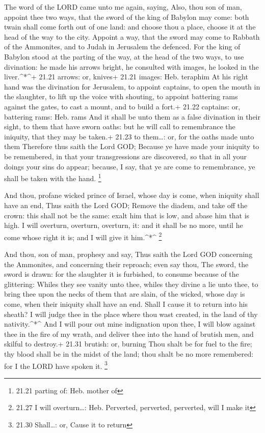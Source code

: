  The word of the LORD came unto me again, saying,
 Also, thou son of man, appoint thee two ways, that the
sword of the king of Babylon may come: both twain shall come forth out
of one land: and choose thou a place, choose it at the head of the way
to the city.  Appoint a way, that the sword may come to
Rabbath of the Ammonites, and to Judah in Jerusalem the defenced.
 For the king of Babylon stood at the parting of the way,
at the head of the two ways, to use divination: he made his arrows
bright, he consulted with images, he looked in the liver.\^{}*\^{}+
21.21 arrows: or, knives+ 21.21 images: Heb. teraphim  At
his right hand was the divination for Jerusalem, to appoint captains, to
open the mouth in the slaughter, to lift up the voice with shouting, to
appoint battering rams against the gates, to cast a mount, and to build
a fort.+ 21.22 captains: or, battering rams: Heb. rams  And
it shall be unto them as a false divination in their sight, to them that
have sworn oaths: but he will call to remembrance the iniquity, that
they may be taken.+ 21.23 to them\ldots: or, for the oaths made unto
them  Therefore thus saith the Lord GOD; Because ye have
made your iniquity to be remembered, in that your transgressions are
discovered, so that in all your doings your sins do appear; because, I
say, that ye are come to remembrance, ye shall be taken with the hand.
\footnote{21.21 parting of: Heb. mother of}

 And thou, profane wicked prince of Israel, whose day is
come, when iniquity shall have an end,  Thus saith the Lord
GOD; Remove the diadem, and take off the crown: this shall not be the
same: exalt him that is low, and abase him that is high.  I
will overturn, overturn, overturn, it: and it shall be no more, until he
come whose right it is; and I will give it him.\^{}*\^{} \footnote{21.27
  I will overturn\ldots: Heb. Perverted, perverted, perverted, will I
  make it}

 And thou, son of man, prophesy and say, Thus saith the
Lord GOD concerning the Ammonites, and concerning their reproach; even
say thou, The sword, the sword is drawn: for the slaughter it is
furbished, to consume because of the glittering:  Whiles
they see vanity unto thee, whiles they divine a lie unto thee, to bring
thee upon the necks of them that are slain, of the wicked, whose day is
come, when their iniquity shall have an end.  Shall I cause
it to return into his sheath? I will judge thee in the place where thou
wast created, in the land of thy nativity.\^{}*\^{}  And I
will pour out mine indignation upon thee, I will blow against thee in
the fire of my wrath, and deliver thee into the hand of brutish men, and
skilful to destroy.+ 21.31 brutish: or, burning  Thou shalt
be for fuel to the fire; thy blood shall be in the midst of the land;
thou shalt be no more remembered: for I the LORD have spoken it.
\footnote{21.30 Shall\ldots: or, Cause it to return}

